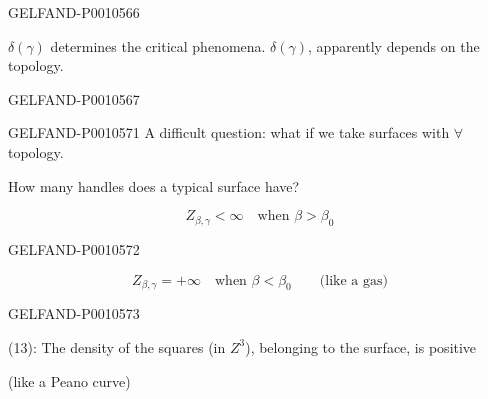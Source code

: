 \begin{GelfandAdjacentEvidence}{GELFAND-P001056}{6}


\(\delta(\gamma)\) determines the critical phenomena. \(\delta(\gamma)\), apparently depends on the topology.
\end{GelfandAdjacentEvidence}
\begin{GelfandAdjacentEvidence}{GELFAND-P001056}{7}


\end{GelfandAdjacentEvidence}



\begin{GelfandAdjacentEvidence}{GELFAND-P001057}{1}
A difficult question: what if we take surfaces with \(\forall\) topology.

How many handles does a typical surface have?

\begin{equation*}
Z_{\beta,\gamma}<\infty\quad\text{when }\beta>\beta_0
\tag{12}
\end{equation*}
\end{GelfandAdjacentEvidence}
\begin{GelfandAdjacentEvidence}{GELFAND-P001057}{2}


\begin{equation*}
Z_{\beta,\gamma}=+\infty\quad\text{when }\beta<\beta_0
  \qquad\text{(like a gas)}
\tag{13}
\end{equation*}
\end{GelfandAdjacentEvidence}
\begin{GelfandAdjacentEvidence}{GELFAND-P001057}{3}


(13): The density of the squares (in \(Z^3\)), belonging to the surface, is positive

(like a Peano curve)
\end{GelfandAdjacentEvidence}
